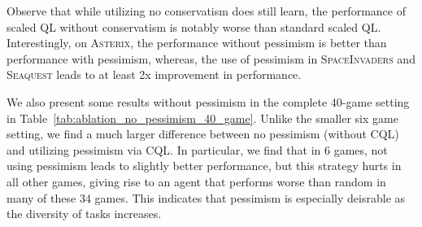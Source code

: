 {Observe that while utilizing no conservatism does still learn, the performance of scaled QL without conservatism is notably worse than standard scaled QL. Interestingly, on \textsc{Asterix}, the performance without pessimism is better than performance with pessimism, whereas, the use of pessimism in \textsc{SpaceInvaders} and \textsc{Seaquest} leads to at least 2x improvement in performance.}

\begin{table}[h]
    \centering
    \centering
    \vspace{-0.1cm}
    \caption{\footnotesize{{\textbf{Performance of scaled QL with and without conservatism in terms of IQM human-normalized score} in the six-game setting for 100 epochs (2x longer training compared to other ablations in Table~\ref{tab:ablation_dr3}) performed with a ResNet 50. Observe that utilizing conservatism via CQL is beneficial. We also present per-game raw scores in this table. Observe that while in one games no pessimism with such data can outperform CQL, we do find that overall, conservatism performs better.}}} 
    \label{tab:ablation_no_pessimism}
    \vspace{0.35cm}
\end{table}

{We also present some results without pessimism in the complete 40-game setting in Table~\ref{tab:ablation_no_pessimism_40_game}. Unlike the smaller six game setting, we find a much larger difference between no pessimism (without CQL) and utilizing pessimism via CQL. In particular, we find that in 6 games, not using pessimism leads to slightly better performance, but this strategy hurts in all other games, giving rise to an agent that performs worse than random in many of these 34 games. This indicates that pessimism is especially deisrable as the diversity of tasks increases.}

